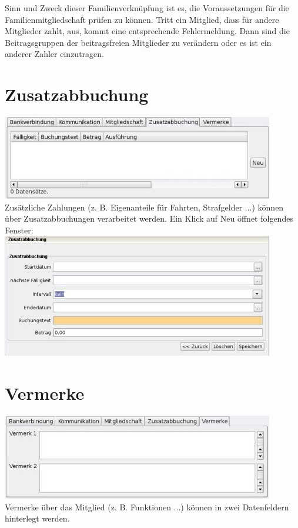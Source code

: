 \documentclass[a4paper,BCOR30mm,DIV14,pdftex,liststotoc,footsepline,openany]{scrbook}
\begin{document}
Sinn und Zweck dieser Familienverknüpfung ist es, die Voraussetzungen für die Familienmitgliedschaft prüfen zu können.
Tritt ein Mitglied, dass für andere Mitglieder zahlt, aus, kommt eine entsprechende Fehlermeldung. Dann sind die Beitragsgruppen der beitragsfreien Mitglieder zu verändern oder es ist ein anderer Zahler einzutragen.

\section{Zusatzabbuchung}
\includegraphics{./screenshots/mitgliedzusatzabbuchung.jpg}\\
Zusätzliche Zahlungen (z. B. Eigenanteile für Fahrten, Strafgelder ...) können über Zusatzabbuchungen verarbeitet werden. Ein Klick auf Neu öffnet folgendes Fenster:\\
\includegraphics{./screenshots/zusatzabbuchung.jpg}\\

\section{Vermerke}
\includegraphics{./screenshots/mitgliedvermerke.jpg}\\
Vermerke über das Mitglied (z. B. Funktionen ...) können in zwei Datenfeldern hinterlegt werden.
\end{document}
